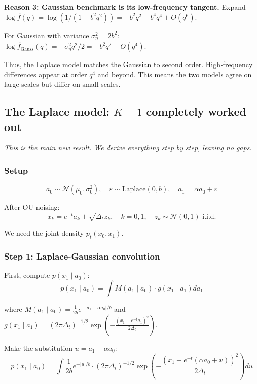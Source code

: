 \documentclass[11pt,a4paper]{article}
\theoremstyle{plain}
\theoremstyle{definition}
\newcommand{\delt}{\Delta_t}
\begin{document}
\textbf{Reason 3: Gaussian benchmark is its low-frequency tangent.}
Expand $\log \hat{f}(q) = \log(1/(1+b^2q^2)) = -b^2 q^2 - b^4 q^4 + O(q^6)$.

For Gaussian with variance $\sigma_\eta^2 = 2b^2$: $\log \hat{f}_{\text{Gauss}}(q) = -\sigma_\eta^2 q^2/2 = -b^2 q^2 + O(q^4)$.

Thus, the Laplace model matches the Gaussian to second order. High-frequency differences appear at order $q^4$ and beyond. This means the two models agree on large scales but differ on small scales.

\subsection{The Laplace model: $K=1$ completely worked out}
\label{sec:laplace-k1}

\textit{This is the main new result. We derive everything step by step, leaving no gaps.}

\subsubsection{Setup}

\begin{equation}
a_0 \sim \mathcal{N}(\mu_0, \sigma_0^2), \quad \varepsilon \sim \text{Laplace}(0,b), \quad a_1 = \alpha a_0 + \varepsilon
\end{equation}

After OU noising:
\begin{equation}
x_k = e^{-t}a_k + \sqrt{\delt}z_k, \quad k=0,1, \quad z_k \sim \mathcal{N}(0,1) \text{ i.i.d.}
\end{equation}

We need the joint density $p_t(x_0, x_1)$.

\subsubsection{Step 1: Laplace-Gaussian convolution}

First, compute $p(x_1 \mid a_0)$:
\begin{equation}
p(x_1 \mid a_0) = \int M(a_1 \mid a_0) \cdot g(x_1 \mid a_1) da_1
\end{equation}

where $M(a_1 \mid a_0) = \frac{1}{2b}e^{-|a_1-\alpha a_0|/b}$ and $g(x_1 \mid a_1) = (2\pi\delt)^{-1/2}\exp\left(-\frac{(x_1-e^{-t}a_1)^2}{2\delt}\right)$.

Make the substitution $u = a_1 - \alpha a_0$:
\begin{equation}
p(x_1 \mid a_0) = \int \frac{1}{2b}e^{-|u|/b} \cdot (2\pi\delt)^{-1/2}\exp\left(-\frac{(x_1 - e^{-t}(\alpha a_0 + u))^2}{2\delt}\right) du
\end{equation}
\end{document}
